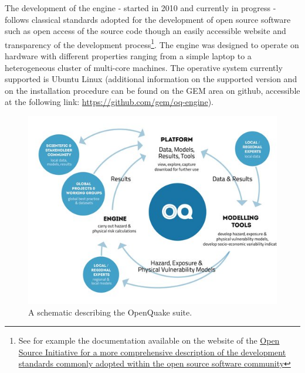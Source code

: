 The development of the engine - started in 2010 and currently in 
progress - follows classical standards adopted for the development 
of open source software such as open access of the source code though an easily
accessible website and transparency of the development process\footnote{See for 
example the documentation available on the website 
of the \href{http://opensource.org/osr}{Open Source Initiative for a 
more comprehensive description of the development standards commonly 
adopted within the open source software community}}.
The engine was designed to operate on hardware with different properties
ranging from a simple laptop to a heterogeneous cluster of multi-core machines.
The operative system currently supported is Ubuntu Linux (additional
information on the supported version and on the installation procedure can 
be found on the GEM area on github, accessible at the following link:
\href{https://github.com/gem/oq-engine}{https://github.com/gem/oq-engine}). 
\begin{figure}[!ht]
\centering
\includegraphics[width=14cm]{./Pictures/intro/OQ-workflows.jpg}
\caption{A schematic describing the OpenQuake suite.}
\label{fig:oq_platform}
\end{figure}
%
